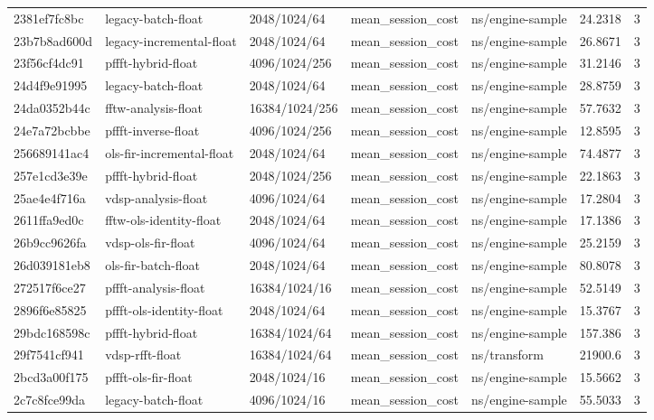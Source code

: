 \begin{longtable}{lllllrr}
2381ef7fc8bc & legacy-batch-float & 2048/1024/64 & mean\_session\_cost & ns/engine-sample & 24.2318 & 3 \\
23b7b8ad600d & legacy-incremental-float & 2048/1024/64 & mean\_session\_cost & ns/engine-sample & 26.8671 & 3 \\
23f56cf4dc91 & pffft-hybrid-float & 4096/1024/256 & mean\_session\_cost & ns/engine-sample & 31.2146 & 3 \\
24d4f9e91995 & legacy-batch-float & 2048/1024/64 & mean\_session\_cost & ns/engine-sample & 28.8759 & 3 \\
24da0352b44c & fftw-analysis-float & 16384/1024/256 & mean\_session\_cost & ns/engine-sample & 57.7632 & 3 \\
24e7a72bcbbe & pffft-inverse-float & 4096/1024/256 & mean\_session\_cost & ns/engine-sample & 12.8595 & 3 \\
256689141ac4 & ols-fir-incremental-float & 2048/1024/64 & mean\_session\_cost & ns/engine-sample & 74.4877 & 3 \\
257e1cd3e39e & pffft-hybrid-float & 2048/1024/256 & mean\_session\_cost & ns/engine-sample & 22.1863 & 3 \\
25ae4e4f716a & vdsp-analysis-float & 4096/1024/64 & mean\_session\_cost & ns/engine-sample & 17.2804 & 3 \\
2611ffa9ed0c & fftw-ols-identity-float & 2048/1024/64 & mean\_session\_cost & ns/engine-sample & 17.1386 & 3 \\
26b9cc9626fa & vdsp-ols-fir-float & 4096/1024/64 & mean\_session\_cost & ns/engine-sample & 25.2159 & 3 \\
26d039181eb8 & ols-fir-batch-float & 2048/1024/64 & mean\_session\_cost & ns/engine-sample & 80.8078 & 3 \\
272517f6ce27 & pffft-analysis-float & 16384/1024/16 & mean\_session\_cost & ns/engine-sample & 52.5149 & 3 \\
2896f6e85825 & pffft-ols-identity-float & 2048/1024/64 & mean\_session\_cost & ns/engine-sample & 15.3767 & 3 \\
29bdc168598c & pffft-hybrid-float & 16384/1024/64 & mean\_session\_cost & ns/engine-sample & 157.386 & 3 \\
29f7541cf941 & vdsp-rfft-float & 16384/1024/64 & mean\_session\_cost & ns/transform & 21900.6 & 3 \\
2bcd3a00f175 & pffft-ols-fir-float & 2048/1024/16 & mean\_session\_cost & ns/engine-sample & 15.5662 & 3 \\
2c7c8fce99da & legacy-batch-float & 4096/1024/16 & mean\_session\_cost & ns/engine-sample & 55.5033 & 3 \\

\end{longtable}
